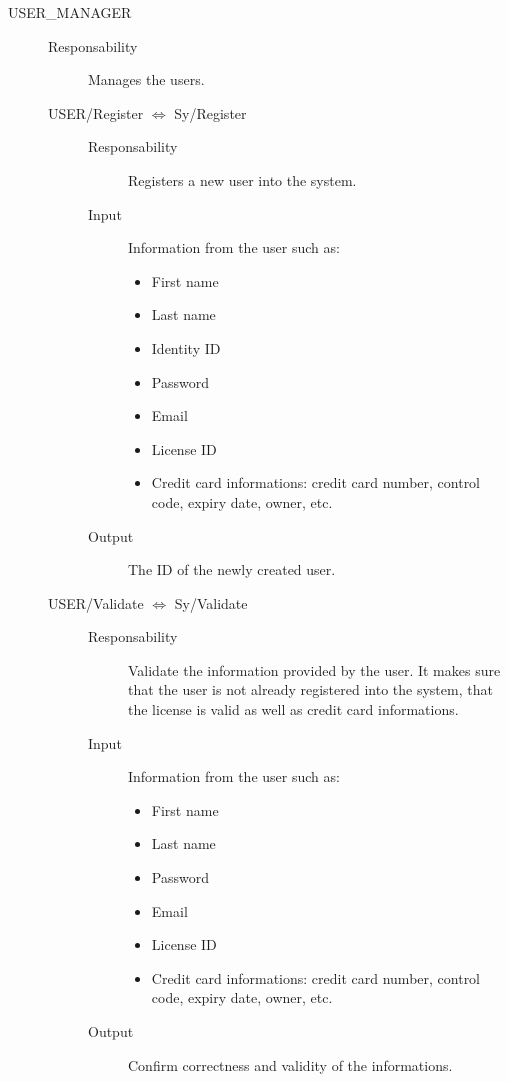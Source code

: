 \documentclass[11pt]{article} %
\begin{document}
\begin{description}

	\item[USER\_MANAGER] \hfill
	\begin{description}
		\item[Responsability] Manages the users.

	\item[USER/Register $\Leftrightarrow$ Sy/Register] \hfill
		\begin{description}
			\item[Responsability] Registers a new user into the system.
			\item[Input] Information from the user such as:
				\begin{itemize}
					\item First name
					\item Last name
					\item Identity ID
					\item Password
					\item Email
					\item License ID
					\item Credit card informations: credit card number, control code, expiry date, owner, etc.
				\end{itemize}
			\item[Output] The ID of the newly created user.
		\end{description}

	\item[USER/Validate $\Leftrightarrow$ Sy/Validate] \hfill
		\begin{description}
			\item[Responsability] Validate the information provided by the user. It makes sure that the user is not already registered into the system, that the license is valid as well as credit card informations.
			\item[Input] Information from the user such as:
				\begin{itemize}
					\item First name
					\item Last name
					\item Password
					\item Email
					\item License ID
					\item Credit card informations: credit card number, control code, expiry date, owner, etc.
				\end{itemize}
			\item[Output] Confirm correctness and validity of the informations.
		\end{description}


\end{description}
\end{description}
\end{document}
